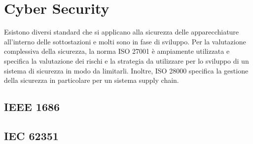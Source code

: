 \section{Cyber Security}
Esistono diversi standard che si applicano alla sicurezza delle apparecchiature all'interno delle sottostazioni e molti sono in fase di sviluppo. Per la valutazione complessiva della sicurezza, la norma ISO 27001 è ampiamente utilizzata e specifica la valutazione dei rischi  e la strategia da utilizzare per lo sviluppo di un sistema di sicurezza in modo da limitarli. Inoltre, ISO 28000 specifica la gestione della sicurezza in particolare per un sistema supply chain.
\subsection{IEEE 1686}
\subsection{IEC 62351}